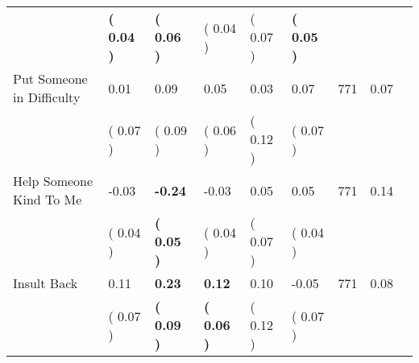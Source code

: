 \begin{tabular}{L{6.2cm} C{1.8cm} C{1.8cm} C{1.8cm} C{1.8cm} C{1.8cm} C{1.8cm} C{0.3cm} C{0.3cm}}
 & \textbf{(     0.04 )} & \textbf{(     0.06 )} & (     0.04 ) & (     0.07 ) & \textbf{(     0.05 )}  & \\
Put Someone in Difficulty &      0.01 &      0.09 &      0.05 &      0.03 &      0.07  & 771 &       0.07 \\ 
 & (     0.07 ) & (     0.09 ) & (     0.06 ) & (     0.12 ) & (     0.07 )  & \\
Help Someone Kind To Me &     -0.03 & \textbf{    -0.24} &     -0.03 &      0.05 &      0.05  & 771 &       0.14 \\ 
 & (     0.04 ) & \textbf{(     0.05 )} & (     0.04 ) & (     0.07 ) & (     0.04 )  & \\
Insult Back &      0.11 & \textbf{     0.23} & \textbf{     0.12} &      0.10 &     -0.05  & 771 &       0.08 \\ 
 & (     0.07 ) & \textbf{(     0.09 )} & \textbf{(     0.06 )} & (     0.12 ) & (     0.07 )  & \\
\bottomrule
\end{tabular}
